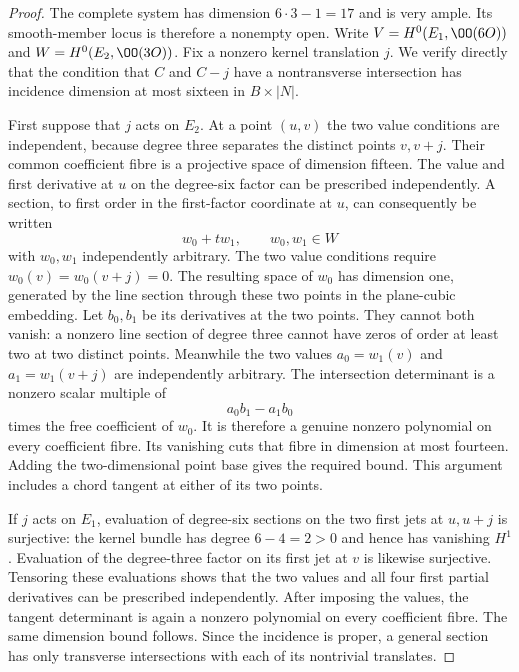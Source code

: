 \begin{proof}
The complete system has dimension $6\cdot3-1=17$ and is very
ample.  Its smooth-member locus is therefore a nonempty open.
Write $V=H^0(E_1,\OO(6O))$ and
$W=H^0(E_2,\OO(3O))$.
Fix a nonzero kernel translation $j$.
We verify directly that the condition that $C$ and $C-j$ have
a nontransverse intersection has incidence dimension at most
sixteen in $B\times|N|$.

First suppose that $j$ acts on $E_2$.
At a point $(u,v)$ the two value conditions are independent,
because degree three separates the distinct points $v,v+j$.
Their common coefficient fibre is a projective space of
dimension fifteen.
The value and first derivative at $u$ on the degree-six factor
can be prescribed independently.  A section, to first order
in the first-factor coordinate at $u$, can consequently be
written
\[
                        w_0+t w_1,
                    \qquad w_0,w_1\in W
\]
with $w_0,w_1$ independently arbitrary.
The two value conditions require $w_0(v)=w_0(v+j)=0$.
The resulting space of $w_0$ has dimension one, generated by
the line section through these two points in the plane-cubic
embedding.  Let $b_0,b_1$ be its derivatives at the two points.
They cannot both vanish: a nonzero line section of degree three
cannot have zeros of order at least two at two distinct points.
Meanwhile the two values $a_0=w_1(v)$ and $a_1=w_1(v+j)$ are
independently arbitrary.
The intersection determinant is a nonzero scalar multiple of
\[
                              a_0b_1-a_1b_0
\]
times the free coefficient of $w_0$.
It is therefore a genuine nonzero polynomial on every coefficient
fibre.  Its vanishing cuts that fibre in dimension at most fourteen.
Adding the two-dimensional point base gives the required bound.
This argument includes a chord tangent at either of its two points.

If $j$ acts on $E_1$, evaluation of degree-six sections on the
two first jets at $u,u+j$ is surjective: the kernel bundle has
degree $6-4=2>0$ and hence has vanishing $H^1$.
Evaluation of the degree-three factor on its first jet at $v$
is likewise surjective.  Tensoring these evaluations shows that
the two values and all four first partial derivatives can be
prescribed independently.  After imposing the values, the
tangent determinant is again a nonzero polynomial on every
coefficient fibre.  The same dimension bound follows.
Since the incidence is proper, a general section has only
transverse intersections with each of its nontrivial translates.


\end{proof}
